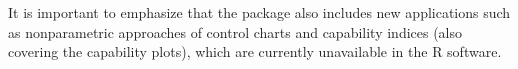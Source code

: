 It is important to emphasize that the  package also includes new applications such as nonparametric approaches of control charts and capability indices (also covering the capability plots), which are currently unavailable in the R software.


% 
% 
% 
% 

